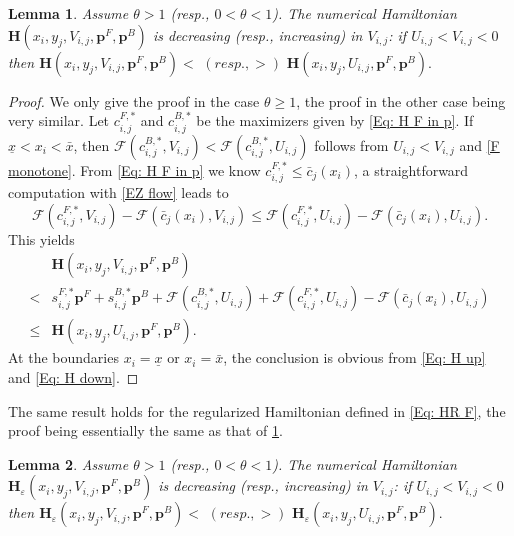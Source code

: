 \documentclass[11pt]{article}
\numberwithin{equation}{section}
\numberwithin{algorithm}{section}
\newtheorem{lemma}[lemma]{Lemma}
\newcommand{\lc}{\left(}
\newcommand{\rc}{\right)}
\newcommand{\eps}{\varepsilon}
\newcommand{\ux}{{\underline x}}
\newcommand{\beq}{\begin{equation}}
\newcommand{\eeq}{\end{equation}}
\theoremstyle{plain}
\begin{document}
\begin{lemma}\label{Lemma: num H_V}
Assume $\theta > 1$ (resp., $0<\theta<1$). The numerical Hamiltonian $\boldsymbol{H}\lc x_i,y_j,V_{i,j},\boldsymbol{p}^{F},\boldsymbol{p}^{B}\rc$ is decreasing (resp., increasing) in $V_{i,j}$: if $U_{i,j}< V_{i,j}<0$ then 
$
\boldsymbol{H}\lc x_i,y_j,V_{i,j},\boldsymbol{p}^{F},\boldsymbol{p}^{B}\rc<\,\, (resp., >)\,\, \boldsymbol{H}\lc x_i,y_j,U_{i,j},\boldsymbol{p}^{F},\boldsymbol{p}^{B}\rc.
$
\end{lemma}
\begin{proof}
We only give the proof in the case $\theta \geq 1$, the proof in the other case being very similar. Let $c^{F,*}_{i,j}$ and $c^{B,*}_{i,j}$ be the maximizers given by \cref{Eq: H F in p}.
If $\ux<x_i<\bar{x}$, then
$
\mathcal{F}\lc c^{B,*}_{i,j},V_{i,j}\rc< \mathcal{F}\lc c^{B,*}_{i,j},U_{i,j}\rc
$
follows from $U_{i,j}< V_{i,j}$ and \cref{F monotone}. From \cref{Eq: H F in p} we know $c^{F,*}_{i,j}\leq \bar{c}_{j}(x_i)$, a straightforward computation with \cref{EZ flow} leads to
$$
\mathcal{F}\lc c^{F,*}_{i,j},V_{i,j}\rc-\mathcal{F}\lc \bar{c}_{j}(x_i),V_{i,j}\rc \leq \mathcal{F}\lc c^{F,*}_{i,j},U_{i,j}\rc-\mathcal{F}\lc \bar{c}_{j}(x_i),U_{i,j}\rc.
$$
This yields 
\beq
\begin{aligned}
&\boldsymbol{H}\lc x_i,y_j,V_{i,j},\boldsymbol{p}^{F},\boldsymbol{p}^{B}\rc\\
< {}&
s^{F,*}_{i,j}\boldsymbol{p}^{F}+s^{B,*}_{i,j}\boldsymbol{p}^{B}+\mathcal{F}\lc c^{B,*}_{i,j},U_{i,j}\rc+\mathcal{F}\lc c^{F,*}_{i,j},U_{i,j}\rc-\mathcal{F}\lc \bar{c}_{j}(x_i),U_{i,j}\rc\\
\leq {}& \boldsymbol{H}\lc x_i,y_j,U_{i,j},\boldsymbol{p}^{F},\boldsymbol{p}^{B}\rc.
\end{aligned}
\eeq
At the boundaries $x_i=\ux$ or $x_i=\bar{x}$, the conclusion is obvious from \cref{Eq: H up} and \cref{Eq: H down}. 
\end{proof}
The same result holds for the regularized Hamiltonian defined in \cref{Eq: HR F}, the proof being essentially the same as that of \cref{Lemma: num H_V}.
\begin{lemma}\label{Lemma: num H_Veps}
Assume $\theta > 1$ (resp., $0<\theta<1$). The numerical Hamiltonian $\boldsymbol{H}_{\eps}\lc x_i,y_j,V_{i,j},\boldsymbol{p}^{F},\boldsymbol{p}^{B}\rc$ is decreasing (resp., increasing) in $V_{i,j}$: if $U_{i,j}< V_{i,j}<0$ then 
$
\boldsymbol{H}_{\eps}\lc x_i,y_j,V_{i,j},\boldsymbol{p}^{F},\boldsymbol{p}^{B}\rc<\,\, (resp., >)\,\, \boldsymbol{H}_{\eps}\lc x_i,y_j,U_{i,j},\boldsymbol{p}^{F},\boldsymbol{p}^{B}\rc.
$
\end{lemma}
\end{document}
